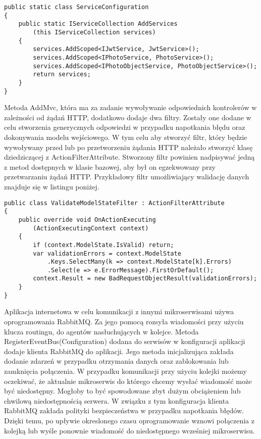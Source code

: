 \begin{lstlisting}[caption={Metoda rozszerzeń umożliwiająca dodanie serwisów do mechanizmów odwróconego sterowania.} ]
public static class ServiceConfiguration
{
	public static IServiceCollection AddServices
		(this IServiceCollection services)
	{
		services.AddScoped<IJwtService, JwtService>();
		services.AddScoped<IPhotoService, PhotoService>();
		services.AddScoped<IPhotoObjectService, PhotoObjectService>();
		return services;
	}
}
\end{lstlisting}

Metoda AddMvc, która ma za zadanie wywoływanie odpowiednich kontrolerów w zależności od żądań HTTP, dodatkowo dodaje dwa filtry. Zostały one dodane w celu stworzenia generycznych odpowiedzi w przypadku napotkania błędu oraz dokonywania modelu wejściowego. W tym celu aby stworzyć filtr, który będzie wywoływany przed lub po przetworzeniu żądania HTTP należało stworzyć klasę dziedziczącej z ActionFilterAttribute. Stworzony filtr powinien nadpisywać jedną z metod dostępnych w klasie bazowej, aby był on egzekwowany przy przetwarzaniu żądań HTTP. Przykładowy filtr umożliwiający walidację danych znajduje się w listingu poniżej.

\begin{lstlisting}[caption={Stworzenie obiektów odwróconego sterowania.},label={dependencyInjectionAndConfiguration} ]
 public class ValidateModelStateFilter : ActionFilterAttribute
{
	public override void OnActionExecuting
		(ActionExecutingContext context)
	{
		if (context.ModelState.IsValid) return;		
		var validationErrors = context.ModelState
			.Keys.SelectMany(k => context.ModelState[k].Errors)
			.Select(e => e.ErrorMessage).FirstOrDefault();		
		context.Result = new BadRequestObjectResult(validationErrors);
	}
}
\end{lstlisting}

Aplikacja internetowa w celu komunikacji z innymi mikroserwisami używa oprogramowania RabbitMQ. Za jego pomocą rozsyła wiadomości przy użyciu klucza routingu, do agentów nasłuchujących w kolejce. Metoda RegisterEventBus(Configuration) dodana do serwisów w konfiguracji aplikacji dodaje klienta RabbitMQ do aplikacji. Jego metoda inicjalizująca zakłada dodanie zdarzeń w przypadku otrzymania danych oraz zablokowania lub zamknięcia połączenia. W przypadku komunikacji przy użyciu kolejki możemy oczekiwać, że aktualnie mikroserwis do którego chcemy wysłać wiadomość może być niedostępny. Mogłoby to być spowodowane zbyt dużym obciążeniem lub chwilową niedostępnością serwera. W związku z tym konfiguracja klienta RabbitMQ zakłada polityki bezpieczeństwa w przypadku napotkania błędów. Dzięki temu, po upływie okreslonego czasu oprogramowanie wznowi połączenia z kolejką lub wyśle ponownie wiadomość do niedostępnego wcześniej mikroserwisu.


